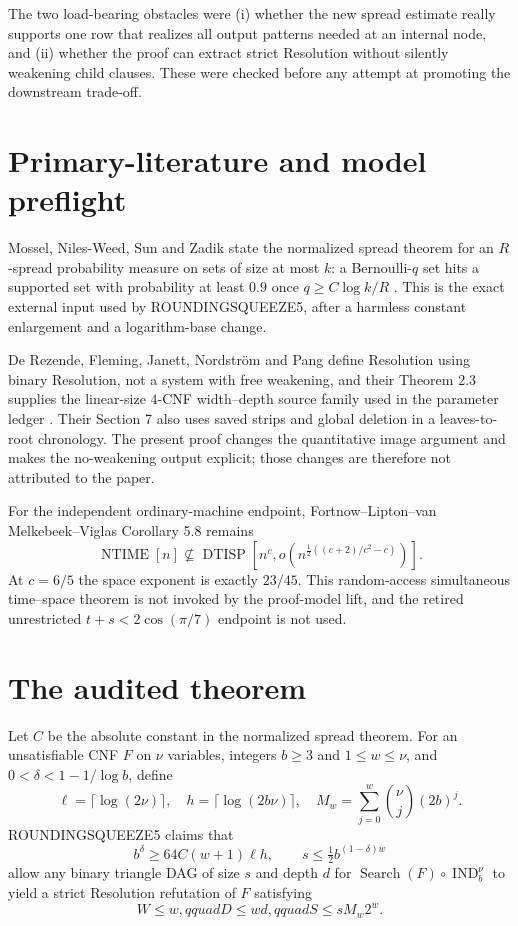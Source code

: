 \documentclass[11pt]{article}
\newcommand{\IND}{\operatorname{IND}}
\begin{document}
The two load-bearing obstacles were (i) whether the new spread estimate
really supports one row that realizes all output patterns needed at an
internal node, and (ii) whether the proof can extract strict Resolution
without silently weakening child clauses.  These were checked before any
attempt at promoting the downstream trade-off.

\section{Primary-literature and model preflight}
Mossel, Niles-Weed, Sun and Zadik state the normalized spread theorem for an
$R$-spread probability measure on sets of size at most $k$: a Bernoulli-$q$
set hits a supported set with probability at least $0.9$ once
$q\ge C\log k/R$ \cite{spread}.  This is the exact external input used by
ROUNDINGSQUEEZE5, after a harmless constant enlargement and a logarithm-base
change.

De Rezende, Fleming, Janett, Nordstr\"om and Pang define Resolution using
binary Resolution, not a system with free weakening, and their Theorem 2.3
supplies the linear-size $4$-CNF width--depth source family used in the
parameter ledger \cite{tradeoff}.  Their Section 7 also uses saved strips
and global deletion in a leaves-to-root chronology.  The present proof
changes the quantitative image argument and makes the no-weakening output
explicit; those changes are therefore not attributed to the paper.

For the independent ordinary-machine endpoint, Fortnow--Lipton--van
Melkebeek--Viglas Corollary 5.8 remains
\[
 \operatorname{NTIME}[n]\not\subseteq
 \operatorname{DTISP}\!\left[n^c,
 o\!\left(n^{\frac12((c+2)/c^2-c)}\right)\right].       \tag{1}
\]
At $c=6/5$ the space exponent is exactly $23/45$.  This random-access
simultaneous time--space theorem is not invoked by the proof-model lift, and
the retired unrestricted $t+s<2\cos(\pi/7)$ endpoint is not used.

\section{The audited theorem}
Let $C$ be the absolute constant in the normalized spread theorem.  For an
unsatisfiable CNF $F$ on $\nu$ variables, integers $b\ge3$ and
$1\le w\le\nu$, and $0<\delta<1-1/\log b$, define
\[
 \ell=\lceil\log(2\nu)\rceil,
 \quad h=\lceil\log(2b\nu)\rceil,
 \quad M_w=\sum_{j=0}^{w}\binom{\nu}{j}(2b)^j.
\]
ROUNDINGSQUEEZE5 claims that
\[
 b^\delta\ge64C(w+1)\ell h,
 \qquad s\le\tfrac12 b^{(1-\delta)w}                    \tag{2}
\]
allow any binary triangle DAG of size $s$ and depth $d$ for
$\operatorname{Search}(F)\circ\IND_b^\nu$ to yield a strict Resolution
refutation of $F$ satisfying
\[
                   W\le w,qquad D\le wd,qquad
                   S\le sM_w2^w.                        \tag{3}
\]
\end{document}
